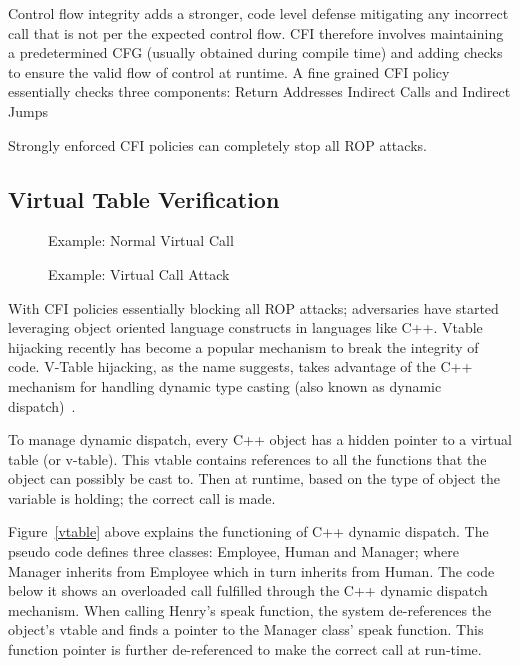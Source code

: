 \documentclass[letterpaper, 10 pt, conference]{ieeeconf}  %
\begin{document}
Control flow integrity adds a stronger, code level defense mitigating any incorrect call that is not per the expected control flow. CFI therefore involves maintaining a predetermined CFG (usually obtained during compile time) and adding checks to ensure the valid flow of control at runtime. A fine grained CFI policy essentially checks three components: 
Return Addresses 
Indirect Calls 
and Indirect Jumps 

Strongly enforced CFI policies can completely stop all ROP attacks.

\subsection{Virtual Table Verification}

\begin{figure}
\label{normal-vcall}

\caption{Example: Normal Virtual Call}
\end{figure}

\begin{figure}
\label{attacker}

\caption{Example: Virtual Call Attack}
\end{figure}

With CFI policies essentially blocking all ROP attacks; adversaries have started leveraging object oriented language constructs in languages like C++. Vtable hijacking recently has become a popular mechanism to break the integrity of code. V-Table hijacking, as the name suggests, takes advantage of the C++ mechanism for handling dynamic type casting (also known as dynamic dispatch)~\cite{coop}.

To manage dynamic dispatch, every C++ object has a hidden pointer to a virtual table (or v-table). This vtable contains references to all the functions that the object can possibly be cast to. Then at runtime, based on the type of object the variable is holding; the correct call is made. 

Figure~\ref{vtable} above explains the functioning of C++ dynamic dispatch. The pseudo code defines three classes: Employee, Human and Manager; where Manager inherits from Employee which in turn inherits from Human. The code below it shows an overloaded call fulfilled through the C++ dynamic dispatch mechanism. When calling Henry's speak function, the system de-references the object's vtable and finds a pointer to the Manager class' speak function. This function pointer is further de-referenced to make the correct call at run-time.
\end{document}

